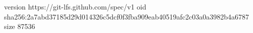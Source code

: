 version https://git-lfs.github.com/spec/v1
oid sha256:2a7abd37185d29d014326c5dcf0f3fba909eab40519afc2c03a0a3982b4a6787
size 87536
